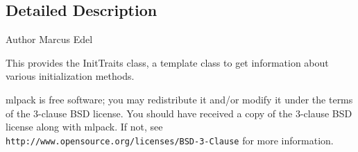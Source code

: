 \subsection{Detailed Description}
\begin{DoxyAuthor}{Author}
Marcus Edel
\end{DoxyAuthor}
This provides the Init\+Traits class, a template class to get information about various initialization methods.

mlpack is free software; you may redistribute it and/or modify it under the terms of the 3-\/clause B\+SD license. You should have received a copy of the 3-\/clause B\+SD license along with mlpack. If not, see {\tt http\+://www.\+opensource.\+org/licenses/\+B\+S\+D-\/3-\/\+Clause} for more information. 